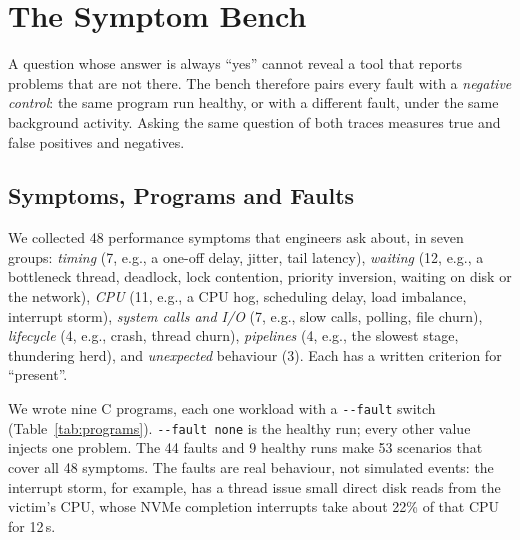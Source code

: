 \section{The Symptom Bench}
\label{sec:bench}

A question whose answer is always ``yes'' cannot reveal a tool that reports problems that are not there. The bench therefore pairs every fault with a \emph{negative control}: the same program run healthy, or with a different fault, under the same background activity. Asking the same question of both traces measures true and false positives and negatives.

\subsection{Symptoms, Programs and Faults}

We collected 48 performance symptoms that engineers ask about, in seven groups: \emph{timing} (7, e.g., a one-off delay, jitter, tail latency), \emph{waiting} (12, e.g., a bottleneck thread, deadlock, lock contention, priority inversion, waiting on disk or the network), \emph{CPU} (11, e.g., a CPU hog, scheduling delay, load imbalance, interrupt storm), \emph{system calls and I/O} (7, e.g., slow calls, polling, file churn), \emph{lifecycle} (4, e.g., crash, thread churn), \emph{pipelines} (4, e.g., the slowest stage, thundering herd), and \emph{unexpected} behaviour (3). Each has a written criterion for ``present''.

We wrote nine C programs, each one workload with a \texttt{-{}-fault} switch (Table~\ref{tab:programs}). \texttt{-{}-fault none} is the healthy run; every other value injects one problem. The 44 faults and 9 healthy runs make 53 scenarios that cover all 48 symptoms. The faults are real behaviour, not simulated events: the interrupt storm, for example, has a thread issue small direct disk reads from the victim's CPU, whose NVMe completion interrupts take about 22\% of that CPU for 12\,s.

